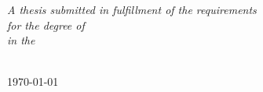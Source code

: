 \documentclass[
11pt, %
oneside, %
english, %
singlespacing, %
headsepline, %
chapterinoneline, %
]{MastersDoctoralThesis} %
\begin{document}
\begin{titlepage}
\begin{center}
\vfill

\large \textit{A thesis submitted in fulfillment of the requirements\\ for the degree of \degreename}\\[0.3cm] %
\textit{in the}\\[0.4cm]
\deptname\\[2cm] %
 
\vfill

{\large \today}\\[4cm] %
 
\vfill
\end{center}
\end{titlepage}

% 
\end{document}

